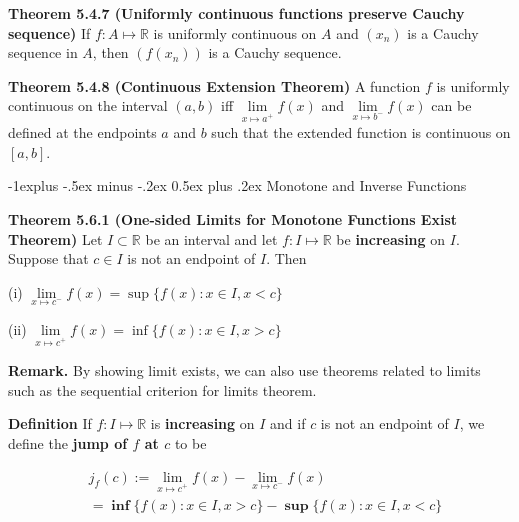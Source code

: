 \documentclass[10pt,landscape]{article}
\makeatletter
\renewcommand{\subsection}{\@startsection{subsection}{2}{0mm}%
                                {-1explus -.5ex minus -.2ex}%
                                {0.5ex plus .2ex}%
                                {\normalfont\normalsize\bfseries}}
\makeatother
\begin{document}
\begin{multicols}{4}
\textbf{Theorem 5.4.7 (Uniformly continuous functions preserve Cauchy sequence)} If $f: A \mapsto \mathbb{R}$ is uniformly continuous on $A$ and $(x_n)$ is a Cauchy sequence in $A$, then $(f(x_n))$ is a Cauchy sequence.

\textbf{Theorem 5.4.8 (Continuous Extension Theorem)} A function $f$ is uniformly continuous on the interval $(a , b)$ iff $\underset{x \mapsto a^+}{\lim} f(x)$ and $\underset{x \mapsto b^-}{\lim} f(x)$ can be defined at the endpoints $a$ and $b$ such that the extended function is continuous on $[a, b]$.

\subsection{Monotone and Inverse Functions}

\textbf{Theorem 5.6.1 (One-sided Limits for Monotone Functions Exist Theorem)} Let $I \subset \mathbb{R}$ be an interval and let $f : I \mapsto \mathbb{R}$ be \textbf{increasing} on $I$. Suppose that $c \in I$ is not an endpoint of $I$. Then 

(i) $\underset{x \mapsto c^-}{\lim} f(x) = \sup \{ f(x): x \in I, x < c \}$

(ii) $\underset{x \mapsto c^+}{\lim} f(x) = \inf \{ f(x): x \in I, x > c \}$

\textbf{Remark.} By showing limit exists, we can also use theorems related to limits such as the sequential criterion for limits theorem.





\textbf{Definition} If $f : I \mapsto \mathbb{R}$ is \textbf{increasing} on $I$ and if $c$ is not an endpoint of $I$, we define the \textbf{jump of $f$ at $c$} to be 

$$
\begin{aligned}
    &j_f(c) := \underset{x \mapsto c^+}{\lim} f(x) - \underset{x \mapsto c^-}{\lim} f(x) \\
           &= \mathbf{\inf} \{ f(x): x \in I, x > c \} - \mathbf{\sup} \{ f(x): x \in I, x < c \} 
\end{aligned}
$$


\end{multicols}
\end{document}
